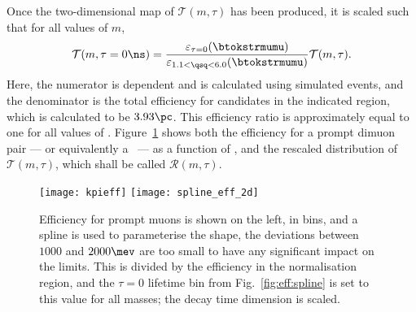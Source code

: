 Once the two-dimensional map of $\mathcal{T}(m,\tau)$ has been produced, it is scaled such that
for all values of $m$,
\begin{equation}
  \mathcal{T}(m,\tau=0\ns) =
  \frac{
    \varepsilon_{\tau=0}(\btokstrmumu)
  }{
    \varepsilon_{1.1<\qsq<6.0}(\btokstrmumu)
  }
  \mathcal{T}(m,\tau).
\end{equation}
Here, the numerator is \qsq dependent and is calculated using
simulated events, and the denominator is the total
efficiency for candidates in the indicated \qsq region, which is calculated to be $3.93\pc$.
This efficiency ratio is approximately equal to one for all values of \mass{\db}.
Figure~\ref{fig:eff:effmap} shows both the efficiency for a prompt dimuon pair --- or equivalently
a \db\ --- as a function of \qsq, and the rescaled distribution of $\mathcal{T}(m,\tau)$, which
shall
be called $\mathcal{R}(m,\tau)$.

\begin{figure}
  \begin{center}
    \texttt{[image: kpieff]}
    \texttt{[image: spline\_eff\_2d]}
    \caption[Relative efficiency map]
    {
      Efficiency \btokstrmumu for prompt muons is shown on the left, in bins, and a spline is used
      to parameterise the shape, the deviations between $1000$ and $2000\mev$ are too small to have
      any significant impact on the limits.
      This is divided by the efficiency in the normalisation region, and the $\tau=0$ lifetime bin
      from Fig.~\ref{fig:eff:spline} is set to this value for all masses; the decay time dimension
      is scaled.
    }
    \label{fig:eff:effmap}
  \end{center}
\end{figure}



